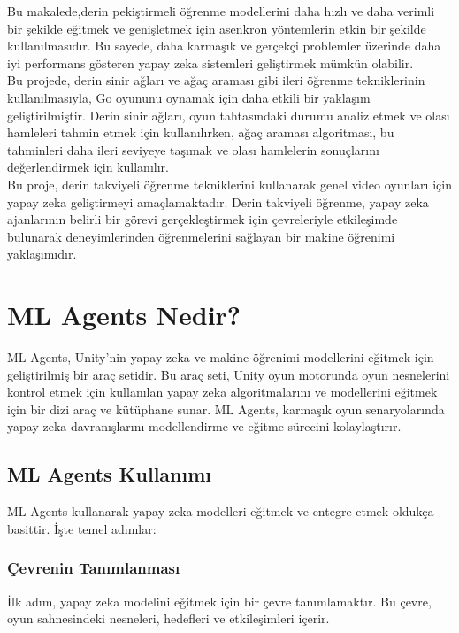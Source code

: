 \documentclass{article}
\begin{document}
Bu makalede,derin pekiştirmeli öğrenme modellerini daha hızlı ve daha verimli bir şekilde eğitmek ve genişletmek için asenkron yöntemlerin etkin bir şekilde kullanılmasıdır. Bu sayede, daha karmaşık ve gerçekçi problemler üzerinde daha iyi performans gösteren yapay zeka sistemleri geliştirmek mümkün olabilir\cite{mnih2016asynchronous}.\\[15pt]

Bu projede, derin sinir ağları ve ağaç araması gibi ileri öğrenme tekniklerinin kullanılmasıyla, Go oyununu oynamak için daha etkili bir yaklaşım geliştirilmiştir. Derin sinir ağları, oyun tahtasındaki durumu analiz etmek ve olası hamleleri tahmin etmek için kullanılırken, ağaç araması algoritması, bu tahminleri daha ileri seviyeye taşımak ve olası hamlelerin sonuçlarını değerlendirmek için kullanılır\cite{silver2016mastering}.\\[15pt]

Bu proje, derin takviyeli öğrenme tekniklerini kullanarak genel video oyunları için yapay zeka geliştirmeyi amaçlamaktadır. Derin takviyeli öğrenme, yapay zeka ajanlarının belirli bir görevi gerçekleştirmek için çevreleriyle etkileşimde bulunarak deneyimlerinden öğrenmelerini sağlayan bir makine öğrenimi yaklaşımıdır.\cite{torrado2018deep}


\newpage


\clearpage


\section{ML Agents Nedir?}
ML Agents, Unity'nin yapay zeka ve makine öğrenimi modellerini eğitmek için geliştirilmiş bir araç setidir. Bu araç seti, Unity oyun motorunda oyun nesnelerini kontrol etmek için kullanılan yapay zeka algoritmalarını ve modellerini eğitmek için bir dizi araç ve kütüphane sunar. ML Agents, karmaşık oyun senaryolarında yapay zeka davranışlarını modellendirme ve eğitme sürecini kolaylaştırır.

\subsection{ML Agents Kullanımı}
ML Agents kullanarak yapay zeka modelleri eğitmek ve entegre etmek oldukça basittir. İşte temel adımlar:

\subsubsection{Çevrenin Tanımlanması}
İlk adım, yapay zeka modelini eğitmek için bir çevre tanımlamaktır. Bu çevre, oyun sahnesindeki nesneleri, hedefleri ve etkileşimleri içerir.
\end{document}
